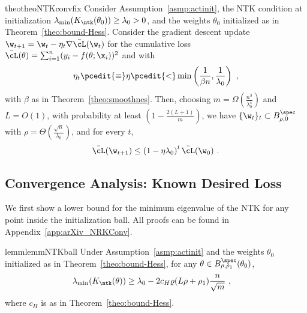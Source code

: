 \begin{restatable}{theo}{theoNTKconvfix}
\label{thm:conv-NTKfix} 
Consider Assumption~\ref{asmp:actinit}, the NTK condition at initialization $\lambda_{\min}(K_{\ntk}(\theta_0))\geq \lambda_0>0$, and the weights $\theta_0$ initialized as in Theorem~\ref{theo:bound-Hess}. Consider the gradient descent update $\w_{t+1} = \w_t - \eta_t \nabla \bar{\cL}(\w_t)$ for the cumulative loss $\bar{\cL}(\theta) = \sum_{i=1}^n (y_i - f(\theta;\x_i))^2$ and with 
\begin{align*}
\eta_t  \pcedit{\equiv} \eta \pcedit{<} \min\left( \frac{1}{\beta n} , \frac{1}{\lambda_0} \right) ~,
\end{align*}
with $\beta$ as in Theorem~\ref{theo:smoothnes}.
Then, choosing
$m=\Omega\left(\frac{n^{3}}{\lambda_0^4}\right)$ and $L=O(1)$,  with probability at least $\left(1-\frac{2(L+1)}{m}\right)$, we have $\{\w_t\}_{t} \subset B^{\spec}_{\rho,0}$ with $\rho = \Theta(\frac{\sqrt{n}}{\lambda_0})$, and for every $t$,
\begin{equation}
    \bar{\cL}(\w_{t+1}) \leq \left(1- \eta \lambda_0 \right)^t \bar{\cL}(\w_0)~.
    \label{eq:conv-NTKfix}
\end{equation}
\end{restatable}



\newpage 

\subsection{Convergence Analysis: Known Desired Loss} 


We first show a lower bound for the minimum eigenvalue of the NTK for any point inside the initialization ball. All proofs can be found in Appendix~\ref{app:arXiv_NRKConv}. 
%
\begin{restatable}{lemm}{lemmNTKball}
\label{lemm:NTK_ball}
Under Assumption~\ref{asmp:actinit} and the weights $\theta_0$ initialized as in Theorem~\ref{theo:bound-Hess}, for any $\theta \in B_{\rho,\rho_1}^{\spec}(\theta_0)$,
\begin{equation}
\begin{split}
\lambda_{\min}(K_{\ntk}(\theta)) &\geq \lambda_0 - 2 c_H \varrho (L\rho+\rho_1) \frac{n}{\sqrt{m}} ~,
\end{split}    
\end{equation}
where $c_H$ is as in Theorem~\ref{theo:bound-Hess}. 
\end{restatable}

